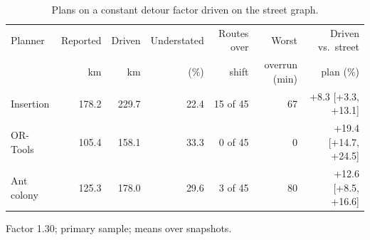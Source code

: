 \begin{table}[!htbp]
\caption{Plans on a constant detour factor driven on the street graph.}
\label{tab:distance}
\centering
\small
\setlength{\tabcolsep}{3pt}
\begin{tabular}{lrrrrrr}
\toprule
Planner & Reported & Driven & Understated & Routes over & Worst & Driven vs.\ street \\
 & km & km & (\%) & shift & overrun (min) & plan (\%) \\
\midrule
Insertion & 178.2 & 229.7 & 22.4 & 15 of 45 & 67 & +8.3 [+3.3, +13.1] \\
OR-Tools & 105.4 & 158.1 & 33.3 & 0 of 45 & 0 & +19.4 [+14.7, +24.5] \\
Ant colony & 125.3 & 178.0 & 29.6 & 3 of 45 & 80 & +12.6 [+8.5, +16.6] \\
\bottomrule
\end{tabular}
\par\smallskip\footnotesize Factor 1.30; primary sample; means over snapshots.
\end{table}
